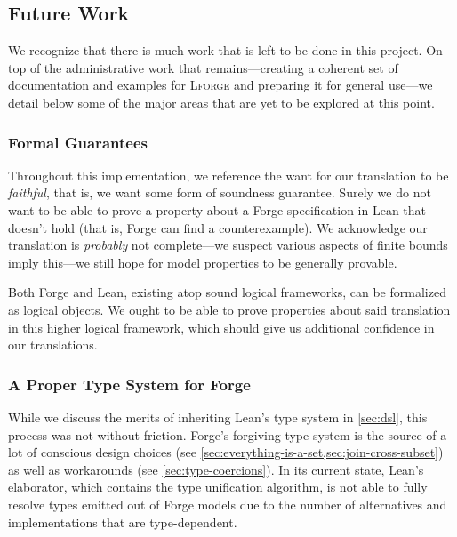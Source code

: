 \subsection{Future Work}\label{sec:future-work}

We recognize that there is much work that is left to be done in this project. On top of the administrative work that remains---creating a coherent set of documentation and examples for \textsc{Lforge} and preparing it for general use---we detail below some of the major areas that are yet to be explored at this point. 

\subsubsection{Formal Guarantees}

Throughout this implementation, we reference the want for our translation to be \emph{faithful}, that is, we want some form of soundness guarantee. Surely we do not want to be able to prove a property about a Forge specification in Lean that doesn't hold (that is, Forge can find a counterexample). We acknowledge our translation is \emph{probably} not complete---we suspect various aspects of finite bounds imply this---we still hope for model properties to be generally provable. 

Both Forge and Lean, existing atop sound logical frameworks, can be formalized as logical objects. We ought to be able to prove properties about said translation in this higher logical framework, which should give us additional confidence in our translations. 

\subsubsection{A Proper Type System for Forge}

While we discuss the merits of inheriting Lean's type system in \cref{sec:dsl}, this process was not without friction. Forge's forgiving type system is the source of a lot of conscious design choices (see \cref{sec:everything-is-a-set,sec:join-cross-subset}) as well as workarounds (see \cref{sec:type-coercions}). In its current state, Lean's elaborator, which contains the type unification algorithm, is not able to fully resolve types emitted out of Forge models due to the number of alternatives and implementations that are type-dependent. 

